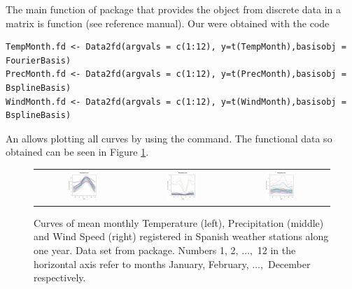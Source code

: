 The main function of  package that provides the  object from discrete data in a matrix is  function (see  reference manual). Our  were obtained with the code

\begin{verbatim}
TempMonth.fd <- Data2fd(argvals = c(1:12), y=t(TempMonth),basisobj = FourierBasis)
PrecMonth.fd <- Data2fd(argvals = c(1:12), y=t(PrecMonth),basisobj = BsplineBasis)
WindMonth.fd <- Data2fd(argvals = c(1:12), y=t(WindMonth),basisobj = BsplineBasis)
\end{verbatim}

An  allows plotting all curves by using the   command. The functional data so obtained can be seen in Figure \ref{FDCurves}.

\begin{figure}
\begin{center}
\begin{tabular}{ccc}
\includegraphics[width=0.33\textwidth]{Graphs/FDTemp.png} &  \includegraphics[width=0.33\textwidth]{Graphs/FDPrec.png} & \includegraphics[width=0.33\textwidth]{Graphs/FDWind.png} \\
\end{tabular}
\end{center}
\caption{Curves of mean monthly Temperature (left), Precipitation (middle) and Wind Speed (right) registered in Spanish weather stations along one year. Data set  from  package. Numbers 1, 2, $\ldots,$ 12 in the horizontal axis refer to months January, February, $\ldots,$ December respectively.}
\label{FDCurves}
\end{figure}

